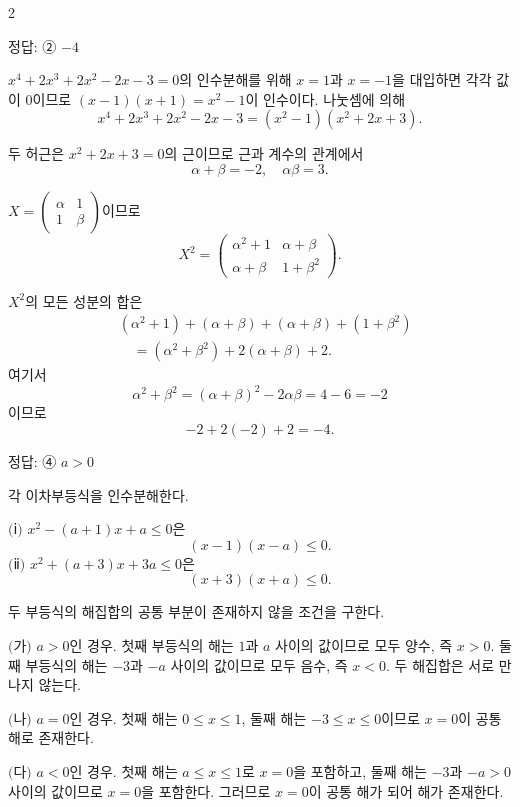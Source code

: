 \documentclass[10pt]{article}
\begin{document}
\begin{multicols}{2}
\begin{answerbox}정답: ② $-4$\end{answerbox}

$x^4 + 2x^3 + 2x^2 - 2x - 3 = 0$의 인수분해를 위해 $x = 1$과 $x = -1$을 대입하면 각각 값이 $0$이므로 $(x - 1)(x + 1) = x^2 - 1$이 인수이다. 나눗셈에 의해
\[ x^4 + 2x^3 + 2x^2 - 2x - 3 = (x^2 - 1)(x^2 + 2x + 3). \]

두 허근은 $x^2 + 2x + 3 = 0$의 근이므로 근과 계수의 관계에서
\[ \alpha + \beta = -2,\quad \alpha\beta = 3. \]

$X = \begin{pmatrix} \alpha & 1 \\ 1 & \beta \end{pmatrix}$이므로
\[ X^2 = \begin{pmatrix} \alpha^2 + 1 & \alpha + \beta \\ \alpha + \beta & 1 + \beta^2 \end{pmatrix}. \]

$X^2$의 모든 성분의 합은
\begin{align*}
&(\alpha^2 + 1) + (\alpha + \beta) + (\alpha + \beta) + (1 + \beta^2) \\
&\quad = (\alpha^2 + \beta^2) + 2(\alpha + \beta) + 2.
\end{align*}
여기서
\[ \alpha^2 + \beta^2 = (\alpha + \beta)^2 - 2\alpha\beta = 4 - 6 = -2 \]
이므로
\[ -2 + 2(-2) + 2 = -4. \]

\begin{answerbox}정답: ④ $a > 0$\end{answerbox}

각 이차부등식을 인수분해한다.

$(\!$ⅰ$)$ $x^2 - (a+1)x + a \le 0$은
\[ (x - 1)(x - a) \le 0. \]
$(\!$ⅱ$)$ $x^2 + (a+3)x + 3a \le 0$은
\[ (x + 3)(x + a) \le 0. \]

두 부등식의 해집합의 공통 부분이 존재하지 않을 조건을 구한다.

$(\!$가$)$ $a > 0$인 경우. 첫째 부등식의 해는 $1$과 $a$ 사이의 값이므로 모두 양수, 즉 $x > 0$. 둘째 부등식의 해는 $-3$과 $-a$ 사이의 값이므로 모두 음수, 즉 $x < 0$. 두 해집합은 서로 만나지 않는다.

$(\!$나$)$ $a = 0$인 경우. 첫째 해는 $0 \le x \le 1$, 둘째 해는 $-3 \le x \le 0$이므로 $x = 0$이 공통 해로 존재한다.

$(\!$다$)$ $a < 0$인 경우. 첫째 해는 $a \le x \le 1$로 $x = 0$을 포함하고, 둘째 해는 $-3$과 $-a > 0$ 사이의 값이므로 $x = 0$을 포함한다. 그러므로 $x = 0$이 공통 해가 되어 해가 존재한다.


\end{multicols}
\end{document}
